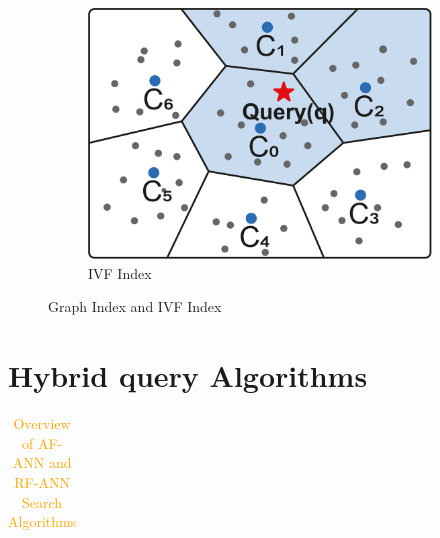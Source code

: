 \documentclass[sigconf, nonacm]{acmart}
\begin{document}
{\begin{figure}
\begin{subfigure}{0.38\columnwidth}
			\includegraphics[width=\linewidth]{figures/ivf.pdf}
			\caption{IVF Index}
			\label{fig:ivf}
		\end{subfigure}
		
		\setlength{\abovecaptionskip}{0.1cm}
		\setlength{\belowcaptionskip}{-0.2cm}		
		\caption{Graph Index and IVF Index}
		
	\end{figure}
	
	
	\section{Hybrid query Algorithms}
	
	
	\renewcommand{\arraystretch}{0.9}
	\begin{table}[t]
		\centering
		
		\caption{\textcolor{orange}{Overview of AF-ANN and RF-ANN Search Algorithms}}
		\small
%			
%			
	\label{tab:compair_1}
	\begin{tabular}{|l|l|*{12}{c|}}
		\hline
		

\end{tabular}
\end{table}}
\end{document}
